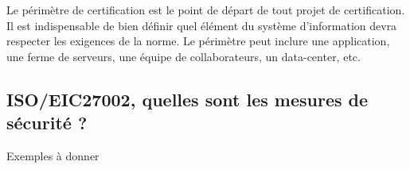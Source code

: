 Le périmètre de certification est le point de départ de tout projet de certification.
Il est indispensable de bien définir quel élément du système d'information devra respecter les exigences de la norme.
Le périmètre peut inclure une application, une ferme de serveurs, une équipe de collaborateurs, un data-center, etc.


\subsection{ISO/EIC27002, quelles sont les mesures de sécurité ?}
Exemples à donner

